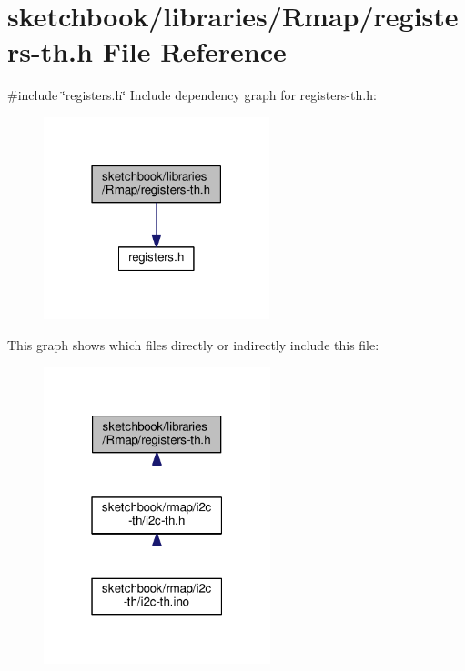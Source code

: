 \hypertarget{registers-th_8h}{}\section{sketchbook/libraries/\+Rmap/registers-\/th.h File Reference}
\label{registers-th_8h}
{\ttfamily \#include \char`\"{}registers.\+h\char`\"{}}\newline
Include dependency graph for registers-\/th.h\+:\nopagebreak
\begin{figure}[H]
\begin{center}
\leavevmode
\includegraphics[width=186pt]{registers-th_8h__incl}
\end{center}
\end{figure}
This graph shows which files directly or indirectly include this file\+:\nopagebreak
\begin{figure}[H]
\begin{center}
\leavevmode
\includegraphics[width=187pt]{registers-th_8h__dep__incl}
\end{center}
\end{figure}
